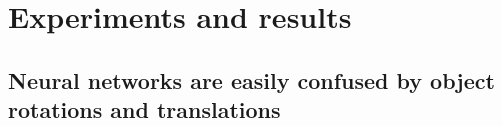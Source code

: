 \documentclass[10pt,twocolumn,letterpaper]{article}
\DeclareMathOperator*{\argmin}{arg\,min}
\begin{document}





\section{Experiments and results}


\subsection{Neural networks are easily confused by object rotations and translations}
\label{sec:easily_confused}

\end{document}
